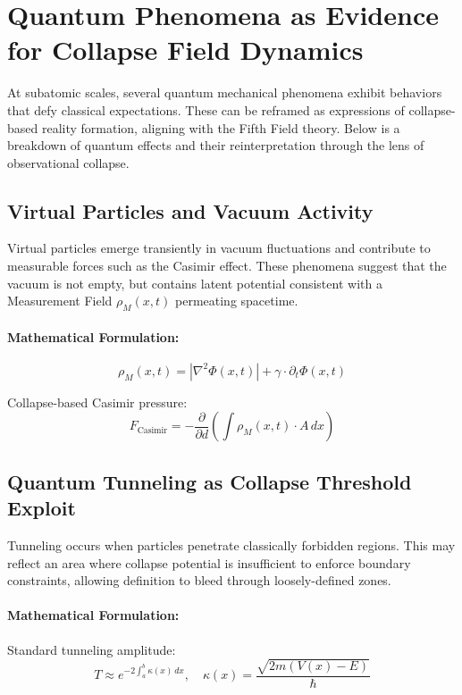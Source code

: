 \appendix{}

\section{Quantum Phenomena as Evidence for Collapse Field Dynamics}

At subatomic scales, several quantum mechanical phenomena exhibit behaviors that defy classical expectations. These can be reframed as expressions of collapse-based reality formation, aligning with the Fifth Field theory. Below is a breakdown of quantum effects and their reinterpretation through the lens of observational collapse.

\subsection{Virtual Particles and Vacuum Activity}
Virtual particles emerge transiently in vacuum fluctuations and contribute to measurable forces such as the Casimir effect. These phenomena suggest that the vacuum is not empty, but contains latent potential consistent with a Measurement Field $\rho_M(x, t)$ permeating spacetime.

\paragraph{Mathematical Formulation:}
\begin{equation}
\rho_M(x,t) = \left| \nabla^2 \Phi(x,t) \right| + \gamma \cdot \partial_t \Phi(x,t)
\end{equation}

Collapse-based Casimir pressure:
\begin{equation}
F_{\text{Casimir}} = -\frac{\partial}{\partial d} \left( \int \rho_M(x,t) \cdot A \, dx \right)
\end{equation}

\subsection{Quantum Tunneling as Collapse Threshold Exploit}
Tunneling occurs when particles penetrate classically forbidden regions. This may reflect an area where collapse potential is insufficient to enforce boundary constraints, allowing definition to bleed through loosely-defined zones.

\paragraph{Mathematical Formulation:}
Standard tunneling amplitude:
\begin{equation}
T \approx e^{-2 \int_a^b \kappa(x) \, dx}, \quad \kappa(x) = \frac{\sqrt{2m(V(x) - E)}}{\hbar}
\end{equation}

